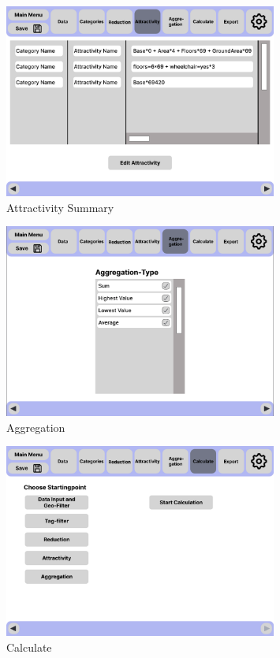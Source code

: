 \documentclass[parskip=full]{scrartcl} %
\begin{document}
\begin{figure}
    \centering
    \includegraphics[width=0.8\textwidth,cfbox=black 1pt 0pt]{pictures/Attractivity 2.png}
    \caption{Attractivity Summary}
\end{figure}

\begin{figure}
    \centering
    \includegraphics[width=0.8\textwidth,cfbox=black 1pt 0pt]{pictures/Aggregation.png}
    \caption{Aggregation}
\end{figure}

\begin{figure}
    \centering
    \includegraphics[width=0.8\textwidth,cfbox=black 1pt 0pt]{pictures/Calculate.png}
    \caption{Calculate}
\end{figure}
\end{document}
